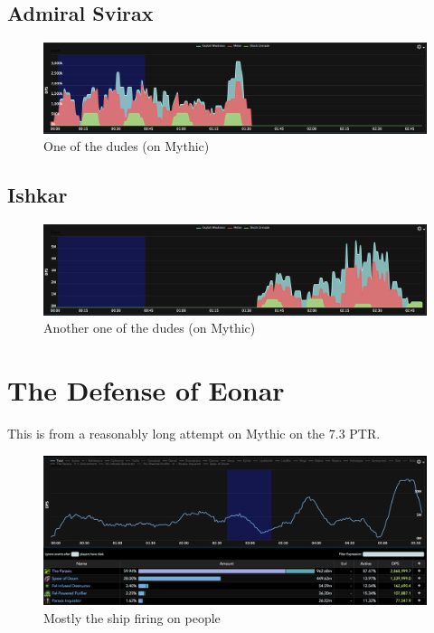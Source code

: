 \documentclass{article}
\begin{document}
\subsection{Admiral Svirax}
\begin{figure}[!htb]
  \includegraphics[width=\linewidth]{03-highcommand-admiralsvirax.png}
  \caption{One of the dudes (on Mythic)}
  \label{fig:dmg3}
\end{figure}

\subsection{Ishkar}
\begin{figure}[!htb]
  \includegraphics[width=\linewidth]{03-highcommand-ishkar.png}
  \caption{Another one of the dudes (on Mythic)}
  \label{fig:dmg3}
\end{figure}


\section{The Defense of Eonar}

This is from a reasonably long attempt on Mythic on the 7.3 PTR.

\begin{figure}[!htb]
  \includegraphics[width=\linewidth]{04-eonar-mythic.png}
  \caption{Mostly the ship firing on people}
  \label{fig:dmg4}
\end{figure}
\end{document}
